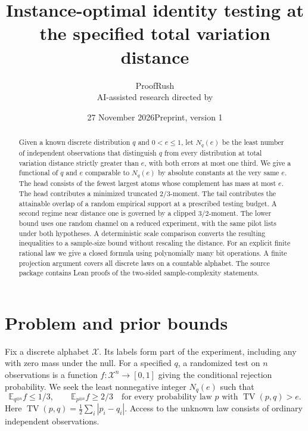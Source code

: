 \documentclass[11pt]{article}
\title{Instance-optimal identity testing at the specified total variation distance}
\author{ProofRush\\[2pt]\small AI-assisted research directed by \titleDirector}
\date{27 November 2026\qquad Preprint, version 1}
\newcommand{\TV}{\operatorname{TV}}
\newcommand{\E}{\mathbb E}
\begin{document}
\maketitle
\begin{abstract}
Given a known discrete distribution $q$ and $0<e\le1$, let $N_q(e)$ be the least number of independent observations that distinguish $q$ from every distribution at total variation distance strictly greater than $e$, with both errors at most one third. We give a functional of $q$ and $e$ comparable to $N_q(e)$ by absolute constants at the very same $e$. The head consists of the fewest largest atoms whose complement has mass at most $e$. The head contributes a minimized truncated $2/3$-moment. The tail contributes the attainable overlap of a random empirical support at a prescribed testing budget. A second regime near distance one is governed by a clipped $3/2$-moment. The lower bound uses one random channel on a reduced experiment, with the same pilot lists under both hypotheses. A deterministic scale comparison converts the resulting inequalities to a sample-size bound without rescaling the distance. For an explicit finite rational law we give a closed formula using polynomially many bit operations. A finite projection argument covers all discrete laws on a countable alphabet. The source package contains Lean proofs of the two-sided sample-complexity statements.
\end{abstract}

\section{Problem and prior bounds}
Fix a discrete alphabet $\mathcal X$. Its labels form part of the experiment, including any with zero mass under the null. For a specified $q$, a randomized test on $n$ observations is a function $f:\mathcal X^n\to[0,1]$ giving the conditional rejection probability. We seek the least nonnegative integer $N_q(e)$ such that
\[
 \E_{q^{\otimes n}} f\le 1/3,\qquad
 \E_{p^{\otimes n}} f\ge 2/3\quad
 \text{for every probability law }p\text{ with }\TV(p,q)>e .
\]
Here $\TV(p,q)=\tfrac12\sum_i|p_i-q_i|$. Access to the unknown law consists of ordinary independent observations.
\end{document}
